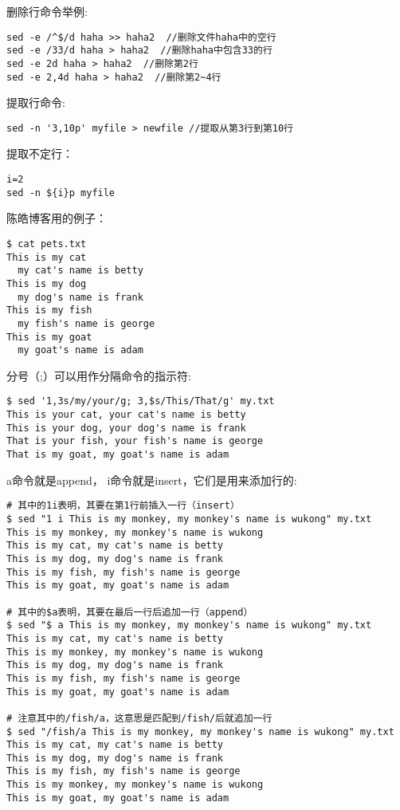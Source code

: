 删除行命令举例:
\begin{verbatim}
sed -e /^$/d haha >> haha2  //删除文件haha中的空行
sed -e /33/d haha > haha2  //删除haha中包含33的行
sed -e 2d haha > haha2  //删除第2行
sed -e 2,4d haha > haha2  //删除第2~4行
\end{verbatim}

提取行命令:
\begin{verbatim}
sed -n '3,10p' myfile > newfile //提取从第3行到第10行
\end{verbatim}

提取不定行：
\begin{verbatim}
i=2
sed -n ${i}p myfile
\end{verbatim}

陈皓博客用的例子：
\begin{verbatim}
$ cat pets.txt
This is my cat
  my cat's name is betty
This is my dog
  my dog's name is frank
This is my fish
  my fish's name is george
This is my goat
  my goat's name is adam
\end{verbatim}

分号（;）可以用作分隔命令的指示符:
\begin{verbatim}
$ sed '1,3s/my/your/g; 3,$s/This/That/g' my.txt
This is your cat, your cat's name is betty
This is your dog, your dog's name is frank
That is your fish, your fish's name is george
That is my goat, my goat's name is adam
\end{verbatim}

a命令就是append， i命令就是insert，它们是用来添加行的:
\begin{verbatim}
# 其中的1i表明，其要在第1行前插入一行（insert）
$ sed "1 i This is my monkey, my monkey's name is wukong" my.txt
This is my monkey, my monkey's name is wukong
This is my cat, my cat's name is betty
This is my dog, my dog's name is frank
This is my fish, my fish's name is george
This is my goat, my goat's name is adam
 
# 其中的$a表明，其要在最后一行后追加一行（append）
$ sed "$ a This is my monkey, my monkey's name is wukong" my.txt
This is my cat, my cat's name is betty
This is my monkey, my monkey's name is wukong
This is my dog, my dog's name is frank
This is my fish, my fish's name is george
This is my goat, my goat's name is adam

# 注意其中的/fish/a，这意思是匹配到/fish/后就追加一行
$ sed "/fish/a This is my monkey, my monkey's name is wukong" my.txt
This is my cat, my cat's name is betty
This is my dog, my dog's name is frank
This is my fish, my fish's name is george
This is my monkey, my monkey's name is wukong
This is my goat, my goat's name is adam
\end{verbatim}

